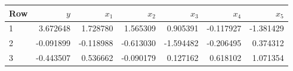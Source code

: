 \begin{center}
\small
\setlength{\tabcolsep}{4pt}
\begin{tabular}{lrrrrrr}
\toprule
Row & $y$ & $x_1$ & $x_2$ & $x_3$ & $x_4$ & $x_5$ \\
\midrule
1 & 3.672648 & 1.728780 & 1.565309 & 0.905391 & -0.117927 & -1.381429 \\
2 & -0.091899 & -0.118988 & -0.613030 & -1.594482 & -0.206495 & 0.374312 \\
3 & -0.443507 & 0.536662 & -0.090179 & 0.127162 & 0.618102 & 1.071354 \\
\bottomrule
\end{tabular}
\end{center}

